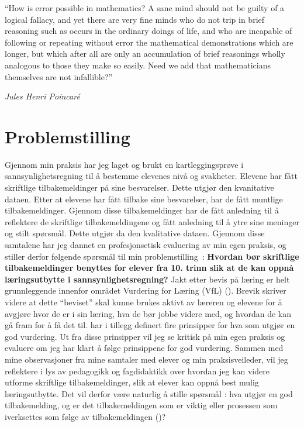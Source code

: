 \documentclass[main.tex]{subfiles}
\begin{document}
\setlength{\epigraphwidth}{0.8\textwidth}
\epigraph{``How is error possible in mathematics? 
A sane mind should not be guilty of a logical fallacy, 
and yet there are very fine minds who do not trip in brief reasoning 
such as occurs in the ordinary doings of life, 
and who are incapable of following or repeating without error 
the mathematical demonstrations which are longer, 
but which after all are only an accumulation of brief reasonings 
wholly analogous to those they make so easily. 
Need we add that mathematicians themselves are not infallible?''}
{\textit{Jules Henri Poincaré}}

\section*{Problemstilling}
Gjennom min praksis har jeg laget og brukt en kartleggingsprøve i sannsynlighetsregning til å bestemme
elevenes nivå og svakheter. Elevene har fått skriftlige tilbakemeldinger på sine besvarelser.
Dette utgjør den kvanitative dataen. Etter at elevene har fått tilbake sine besvarelser, har de fått
muntlige tilbakemeldinger. Gjennom disse tilbakemeldinger har de fått anledning til å reflektere
de skriftlige tilbakemeldingene og fått anledning til å ytre sine meninger og stilt spørsmål. Dette utgjør
da den kvalitative dataen. Gjennom disse samtalene har jeg dannet en profesjonsetisk
evaluering av min egen praksis, og stiller derfor følgende spørsmål til min \mbox{problemstilling :}
\newline
\newline
\textbf{Hvordan bør skriftlige tilbakemeldinger benyttes for elever fra 10.
trinn slik at de kan oppnå læringsutbytte i sannsynlighetsregning?}
\newline
\newline
Jakt etter bevis på læring er helt grunnleggende innenfor området Vurdering for Læring (VfL)
(). Brevik skriver videre at dette ``beviset'' skal kunne brukes aktivt
av læreren og elevene for å avgjøre hvor de er i sin læring, hva de bør jobbe videre med, og
hvordan de kan gå fram for å få det til.  har i tillegg definert fire
prinsipper for hva som utgjør en god vurdering. Ut fra disse prinsipper vil jeg se kritisk på min
egen praksis og evaluere om jeg har klart å følge prinsippene for god vurdering. Sammen med
mine observasjoner fra mine samtaler med elever og min praksisveileder, vil jeg reflektere i lys
av pedagogikk og fagdidaktikk over hvordan jeg kan videre utforme skriftlige tilbakemeldinger,
slik at elever kan oppnå best mulig læringsutbytte. Det vil derfor være naturlig å stille spørsmål :
hva utgjør en god tilbakemelding, og er det tilbakemeldingen som er viktig eller prosessen som
iverksettes som følge av tilbakemeldingen ()?  
\end{document}
